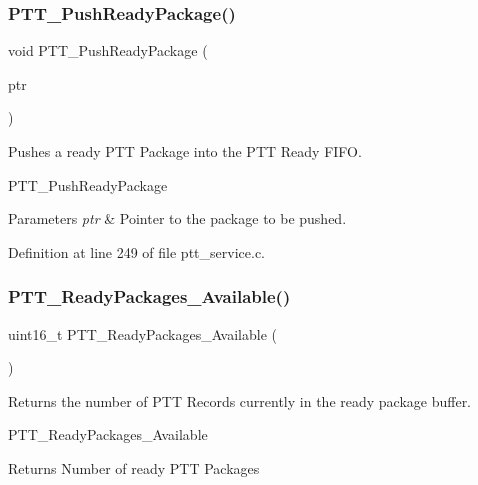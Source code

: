 \subsubsection{\texorpdfstring{P\+T\+T\+\_\+\+Push\+Ready\+Package()}{PTT\_PushReadyPackage()}}
{\footnotesize\ttfamily void P\+T\+T\+\_\+\+Push\+Ready\+Package (\begin{DoxyParamCaption}\item[{P\+T\+T\+Package\+\_\+\+Typedef $\ast$}]{ptr }\end{DoxyParamCaption})}



Pushes a ready P\+TT Package into the P\+TT Ready F\+I\+FO. 

P\+T\+T\+\_\+\+Push\+Ready\+Package 
\begin{DoxyParams}{Parameters}
{\em ptr} & Pointer to the package to be pushed. \\
\hline
\end{DoxyParams}


Definition at line 249 of file ptt\+\_\+service.\+c.

\mbox{\label{group___p_t_t___service_ga4a212273c3b5f412315e299ba2d29b71}} 
\subsubsection{\texorpdfstring{P\+T\+T\+\_\+\+Ready\+Packages\+\_\+\+Available()}{PTT\_ReadyPackages\_Available()}}
{\footnotesize\ttfamily uint16\+\_\+t P\+T\+T\+\_\+\+Ready\+Packages\+\_\+\+Available (\begin{DoxyParamCaption}\item[{void}]{ }\end{DoxyParamCaption})}



Returns the number of P\+TT Records currently in the ready package buffer. 

P\+T\+T\+\_\+\+Ready\+Packages\+\_\+\+Available

\begin{DoxyReturn}{Returns}
Number of ready P\+TT Packages 
\end{DoxyReturn}


